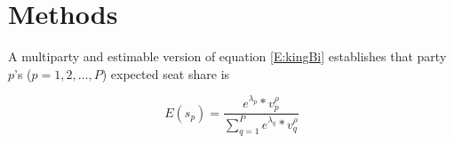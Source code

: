 \documentclass[letter,12pt]{article}
\begin{document}



\section{Methods}


A multiparty and estimable version of equation \ref{E:kingBi} \citep{king.1990elRespBiasMultiparty} establishes that party $p$'s ($p=1,2,\ldots,P$) expected seat share is 

\begin{equation}\label{E:kingMulti}
 E(s_p) = \frac{e^{\lambda_p} * v_p^\rho}{\sum_{q=1}^{P} e^{\lambda_q} * v_q^\rho}
\end{equation}
\end{document}
